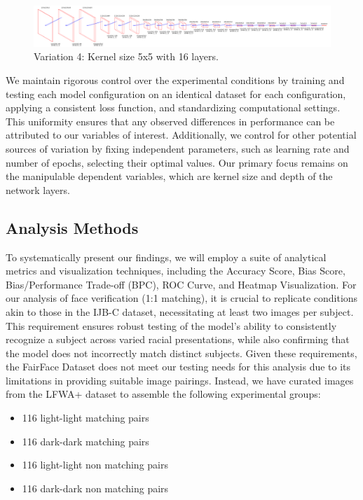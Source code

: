 \documentclass[conference]{IEEEtran}
\begin{document}
\begin{figure}[htbp]
    \centerline{\includegraphics[width=1\linewidth]{latex/images/16_conv_layers_5x5Filters_noFlat.png}}
    \caption{Variation 4: Kernel size 5x5 with 16 layers.}
    \label{var4}
\end{figure}


We maintain rigorous control over the experimental conditions by training and testing each model configuration on an identical dataset for each configuration, applying a consistent loss function, and standardizing computational settings. This uniformity ensures that any observed differences in performance can be attributed to our variables of interest. Additionally, we control for other potential sources of variation by fixing independent parameters, such as learning rate and number of epochs, selecting their optimal values. Our primary focus remains on the manipulable dependent variables, which are kernel size and depth of the network layers.

\subsection{Analysis Methods}
To systematically present our findings, we will employ a suite of analytical metrics and visualization techniques, including the Accuracy Score, Bias Score, Bias/Performance Trade-off (BPC), ROC Curve, and Heatmap Visualization. For our analysis of face verification (1:1 matching), it is crucial to replicate conditions akin to those in the IJB-C \cite{maze2018iarpa} dataset, necessitating at least two images per subject. This requirement ensures robust testing of the model's ability to consistently recognize a subject across varied racial presentations, while also confirming that the model does not incorrectly match distinct subjects. Given these requirements, the FairFace Dataset does not meet our testing needs for this analysis due to its limitations in providing suitable image pairings. Instead, we have curated images from the LFWA+\cite{liu2015faceattributes} dataset to assemble the following experimental groups:
 
\begin{itemize}
    \item 116 light-light matching pairs
    \item 116 dark-dark matching pairs
    \item 116 light-light non matching pairs
    \item 116 dark-dark non matching pairs
\end{itemize}
\end{document}
